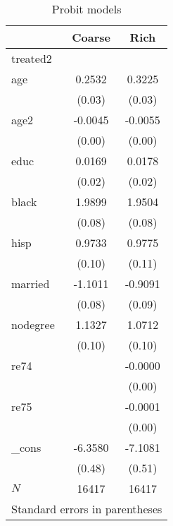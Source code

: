 \begin{table}[htbp]\centering
\caption{Probit models\label{q3}}
\begin{tabular}{l*{2}{c}}
\toprule
            &\multicolumn{1}{c}{Coarse}&\multicolumn{1}{c}{Rich}\\
\midrule
treated2    &            &            \\
age         &      0.2532&      0.3225\\
            &      (0.03)&      (0.03)\\
\addlinespace
age2        &     -0.0045&     -0.0055\\
            &      (0.00)&      (0.00)\\
\addlinespace
educ        &      0.0169&      0.0178\\
            &      (0.02)&      (0.02)\\
\addlinespace
black       &      1.9899&      1.9504\\
            &      (0.08)&      (0.08)\\
\addlinespace
hisp        &      0.9733&      0.9775\\
            &      (0.10)&      (0.11)\\
\addlinespace
married     &     -1.1011&     -0.9091\\
            &      (0.08)&      (0.09)\\
\addlinespace
nodegree    &      1.1327&      1.0712\\
            &      (0.10)&      (0.10)\\
\addlinespace
re74        &            &     -0.0000\\
            &            &      (0.00)\\
\addlinespace
re75        &            &     -0.0001\\
            &            &      (0.00)\\
\addlinespace
\_cons      &     -6.3580&     -7.1081\\
            &      (0.48)&      (0.51)\\
\midrule
\(N\)       &       16417&       16417\\
\bottomrule
\multicolumn{3}{l}{\footnotesize Standard errors in parentheses}\\
\end{tabular}
\end{table}
